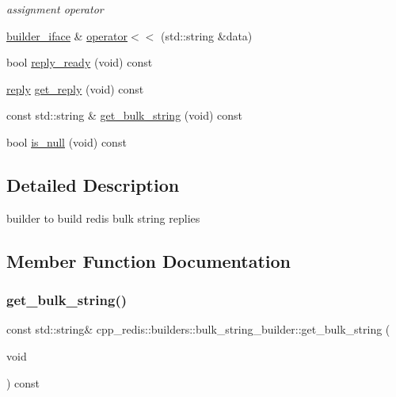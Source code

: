 \begin{DoxyCompactItemize}
\begin{DoxyCompactList}\small\item\em assignment operator \end{DoxyCompactList}\item 
\mbox{\hyperlink{classcpp__redis_1_1builders_1_1builder__iface}{builder\+\_\+iface}} \& \mbox{\hyperlink{classcpp__redis_1_1builders_1_1bulk__string__builder_a43000357f87212f657aafe279a92b541}{operator$<$$<$}} (std\+::string \&data)
\item 
bool \mbox{\hyperlink{classcpp__redis_1_1builders_1_1bulk__string__builder_a4d80d8dfe305e35aca8b4ec84c56fbea}{reply\+\_\+ready}} (void) const
\item 
\mbox{\hyperlink{classcpp__redis_1_1reply}{reply}} \mbox{\hyperlink{classcpp__redis_1_1builders_1_1bulk__string__builder_a56d6d3089107a1bccd63f6a5267c16cb}{get\+\_\+reply}} (void) const
\item 
const std\+::string \& \mbox{\hyperlink{classcpp__redis_1_1builders_1_1bulk__string__builder_a6b3e70acab5c115609db774becbcc571}{get\+\_\+bulk\+\_\+string}} (void) const
\item 
bool \mbox{\hyperlink{classcpp__redis_1_1builders_1_1bulk__string__builder_a2a6ab893dbe5ad2433df18ce62ca6211}{is\+\_\+null}} (void) const
\end{DoxyCompactItemize}


\subsection{Detailed Description}
builder to build redis bulk string replies 

\subsection{Member Function Documentation}
\mbox{\label{classcpp__redis_1_1builders_1_1bulk__string__builder_a6b3e70acab5c115609db774becbcc571}} 
\subsubsection{\texorpdfstring{get\+\_\+bulk\+\_\+string()}{get\_bulk\_string()}}
{\footnotesize\ttfamily const std\+::string\& cpp\+\_\+redis\+::builders\+::bulk\+\_\+string\+\_\+builder\+::get\+\_\+bulk\+\_\+string (\begin{DoxyParamCaption}\item[{void}]{ }\end{DoxyParamCaption}) const}

